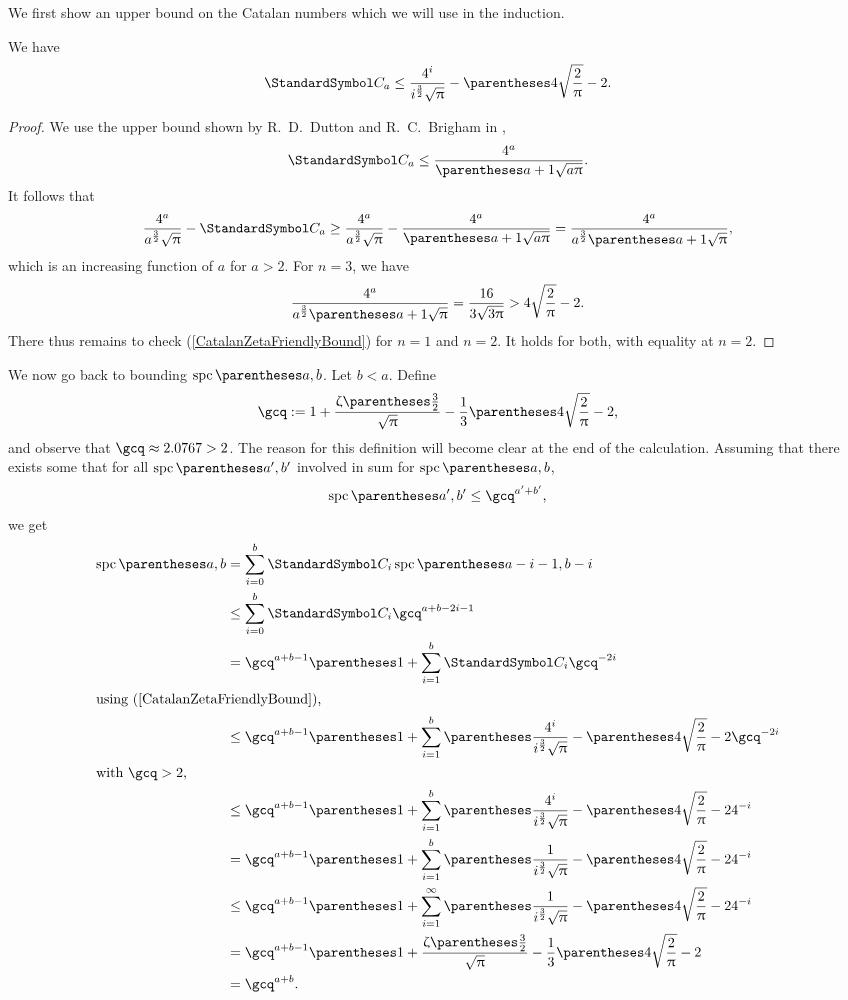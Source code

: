 We first show an upper bound on the Catalan numbers which we will use in the induction.
\begin{remark}
We have\begin{equation}
\CatalanNumber a \leq \frac{4^i}{i^{\frac 3 2}\sqrt{\Pi}}-\pa{4\sqrt{\frac 2 \Pi}-2} \text.\label{CatalanZetaFriendlyBound}
\end{equation}
\begin{proof}
We use the upper bound shown by R.~D.~Dutton and R.~C.~Brigham in \cite{DuttonBrigham1986},\[
\CatalanNumber a\leq \frac{4^a}{\pa{a+1}\sqrt{a\Pi}}\text.
\]
It follows that\[
\frac{4^a}{a^{\frac 3 2}\sqrt{\Pi}} - \CatalanNumber a \geq \frac{4^a}{a^{\frac 3 2}\sqrt{\Pi}} - \frac{4^a}{\pa{a+1}\sqrt{a\Pi}} = \frac{4^a}{a^{\frac 3 2}\pa{a+1}\sqrt{\Pi}}\text,
\]
which is an increasing function of $a$ for $a>2$. For $n=3$, we have\[
\frac{4^a}{a^{\frac 3 2}\pa{a+1}\sqrt{\Pi}}=\frac{16}{3\sqrt{3\Pi}}>4\sqrt{\frac 2 \Pi}-2\text.
\]
There thus remains to check (\ref{CatalanZetaFriendlyBound}) for $n=1$ and $n=2$. It holds for both, with equality at $n=2$.
\end{proof}
\end{remark}
We now go back to bounding $\spc\of{a,b}$.
Let $b<a$. Define\[
\gcq\DefineAs 1+\frac{\RiemannZeta\of{\frac 3 2}}{\sqrt{\Pi}}-\frac{1}{3}\pa{4\sqrt{\frac 2 \Pi}-2}\text,
\]
and observe that $\gcq\approx 2.0767 > 2$. The reason for this definition will become clear at the end of the calculation.
Assuming that there exists some that for all $\spc\of{a',b'}$ involved in sum
for $\spc\of{a,b}$,\[
\spc\of{a',b'}\leq\gcq^{a'+b'}\text,
\]
we get\begin{align*}
\spc\of{a,b} &= \sum{i=0}[b] \CatalanNumber {i} \spc\of{a-i-1,b-i} \\
 &\leq \sum{i=0}[b] \CatalanNumber {i} \gcq^{a+b-2i-1} \\
 &= \gcq^{a+b-1}\pa{1+\sum{i=1}[b] \CatalanNumber {i} \gcq^{-2i}}\\
\intertext{using (\ref{CatalanZetaFriendlyBound}),}
 &\leq \gcq^{a+b-1}\pa{1+\sum{i=1}[b] \pa{\frac{4^i}{i^{\frac 3 2}\sqrt{\Pi}}-\pa{4\sqrt{\frac 2 \Pi}-2}} \gcq^{-2i}} \\
\intertext{with $\gcq > 2$,}
 &\leq \gcq^{a+b-1}\pa{1+\sum{i=1}[b] \pa{\frac{4^i}{i^{\frac 3 2}\sqrt{\Pi}}-\pa{4\sqrt{\frac 2 \Pi}-2}} 4^{-i}} \\
 &= \gcq^{a+b-1}\pa{1+\sum{i=1}[b] \pa{\frac{1}{i^{\frac 3 2}\sqrt{\Pi}}-\pa{4\sqrt{\frac 2 \Pi}-2} 4^{-i}}} \\
 &\leq \gcq^{a+b-1}\pa{1+\sum{i=1}[\infty] \pa{\frac{1}{i^{\frac 3 2}\sqrt{\Pi}}-\pa{4\sqrt{\frac 2 \Pi}-2} 4^{-i}}} \\
 &= \gcq^{a+b-1}\pa{1+\frac{\RiemannZeta\of{\frac 3 2}}{\sqrt{\Pi}}-\frac{1}{3}\pa{4\sqrt{\frac 2 \Pi}-2}} \\
 &= \gcq^{a+b}\text.
\end{align*}
